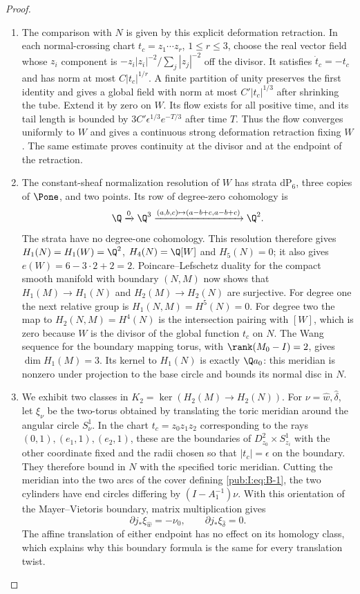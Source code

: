 \begin{proof}
\begin{enumerate}[label=\arabic*.,leftmargin=*]
\item The comparison with $N$ is given by this explicit deformation
retraction. In each normal-crossing chart
$t_c=z_1\cdots z_r$, $1\le r\le3$, choose the real vector field
whose $z_i$ component is
$-z_i|z_i|^{-2}/\sum_j|z_j|^{-2}$ off the divisor.
It satisfies $\dot t_c=-t_c$ and has norm at most
$C|t_c|^{1/r}$. A finite partition of unity preserves the first
identity and gives a global field with norm at most
$C'|t_c|^{1/3}$ after shrinking the tube. Extend it by zero on $W$.
Its flow exists for all positive time, and its tail length is
bounded by $3C'\epsilon^{1/3}e^{-T/3}$ after time $T$.
Thus the flow converges uniformly to $W$ and gives a continuous
strong deformation retraction fixing $W$. The same estimate proves
continuity at the divisor and at the endpoint of the retraction.

\item The constant-sheaf normalization resolution of $W$ has strata
$\mathrm{dP}_6$, three copies of $\Pone$, and two points.
Its row of degree-zero cohomology is
\[
 \Q\xrightarrow{0}\Q^3
 \xrightarrow{(a,b,c)\mapsto(a-b+c,a-b+c)}\Q^2.
\]
The strata have no degree-one cohomology. This resolution therefore
gives $H_1(N)=H_1(W)=\Q^2$, $H_4(N)=\Q[W]$ and $H_5(N)=0$;
it also gives $e(W)=6-3\cdot2+2=2$.
Poincare--Lefschetz duality for the compact smooth manifold with
boundary $(N,M)$ now shows that $H_1(M)\to H_1(N)$ and
$H_2(M)\to H_2(N)$ are surjective. For degree one the next
relative group is $H_1(N,M)=H^5(N)=0$.
For degree two the map to $H_2(N,M)=H^4(N)$ is the intersection
pairing with $[W]$, which is zero because $W$ is the divisor of
the global function $t_c$ on $N$. The Wang sequence for the
boundary mapping torus, with $\rank(M_0-I)=2$, gives
$\dim H_1(M)=3$. Its kernel to $H_1(N)$ is exactly
$\Q a_0$: this meridian is nonzero under projection to the base
circle and bounds its normal disc in $N$.

\item We exhibit two classes in
$K_2=\ker(H_2(M)\to H_2(N))$.
For $\nu=\hat w,\hat\delta$, let $\xi_\nu$ be the two-torus
obtained by translating the toric meridian around the angular
circle $S^1_\nu$. In the chart $t_c=z_0z_1z_2$ corresponding to
the rays $(0,1),(e_1,1),(e_2,1)$, these are the boundaries of
$D^2_{z_0}\times S^1_{z_i}$ with the other coordinate fixed
and the radii chosen so that $|t_c|=\epsilon$ on the boundary.
They therefore bound in $N$ with the specified toric meridian.
Cutting the meridian into the two arcs of the cover defining
\eqref{pub:I:eq:B-1}, the two cylinders have end circles differing by
$(I-A_1^{-1})\nu$. With this orientation of the Mayer--Vietoris
boundary, matrix multiplication gives
\begin{equation}
 \partial j_*\xi_{\hat w}=-\nu_0,\qquad
 \partial j_*\xi_{\hat\delta}=0.
\label{pub:I:eq:B-3}
\end{equation}
The affine translation of either endpoint has no effect on its
homology class, which explains why this boundary formula is the
same for every translation twist.


\end{enumerate}
\end{proof}
